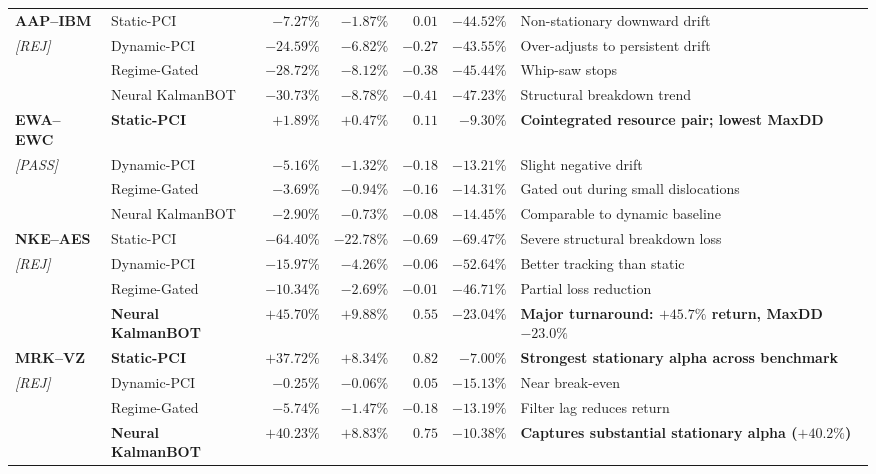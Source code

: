\documentclass[11pt, a4paper]{article}
\begin{document}
\begin{center}
\begin{longtable}{llrrrrp{4.8cm}}
\textbf{AAP--IBM} & Static-PCI & $-7.27\%$ & $-1.87\%$ & $0.01$ & $-44.52\%$ & Non-stationary downward drift \\
\small\textit{[REJ]} & Dynamic-PCI & $-24.59\%$ & $-6.82\%$ & $-0.27$ & $-43.55\%$ & Over-adjusts to persistent drift \\
 & Regime-Gated & $-28.72\%$ & $-8.12\%$ & $-0.38$ & $-45.44\%$ & Whip-saw stops \\
 & Neural KalmanBOT & $-30.73\%$ & $-8.78\%$ & $-0.41$ & $-47.23\%$ & Structural breakdown trend \\
\midrule
\textbf{EWA--EWC} & \textbf{Static-PCI} & $\mathbf{+1.89\%}$ & $\mathbf{+0.47\%}$ & $\mathbf{0.11}$ & $\mathbf{-9.30\%}$ & \textbf{Cointegrated resource pair; lowest MaxDD} \\
\small\textit{[PASS]} & Dynamic-PCI & $-5.16\%$ & $-1.32\%$ & $-0.18$ & $-13.21\%$ & Slight negative drift \\
 & Regime-Gated & $-3.69\%$ & $-0.94\%$ & $-0.16$ & $-14.31\%$ & Gated out during small dislocations \\
 & Neural KalmanBOT & $-2.90\%$ & $-0.73\%$ & $-0.08$ & $-14.45\%$ & Comparable to dynamic baseline \\
\midrule
\textbf{NKE--AES} & Static-PCI & $-64.40\%$ & $-22.78\%$ & $-0.69$ & $-69.47\%$ & Severe structural breakdown loss \\
\small\textit{[REJ]} & Dynamic-PCI & $-15.97\%$ & $-4.26\%$ & $-0.06$ & $-52.64\%$ & Better tracking than static \\
 & Regime-Gated & $-10.34\%$ & $-2.69\%$ & $-0.01$ & $-46.71\%$ & Partial loss reduction \\
 & \textbf{Neural KalmanBOT} & $\mathbf{+45.70\%}$ & $\mathbf{+9.88\%}$ & $\mathbf{0.55}$ & $\mathbf{-23.04\%}$ & \textbf{Major turnaround: $+45.7\%$ return, MaxDD $-23.0\%$} \\
\midrule
\textbf{MRK--VZ} & \textbf{Static-PCI} & $\mathbf{+37.72\%}$ & $\mathbf{+8.34\%}$ & $\mathbf{0.82}$ & $\mathbf{-7.00\%}$ & \textbf{Strongest stationary alpha across benchmark} \\
\small\textit{[REJ]} & Dynamic-PCI & $-0.25\%$ & $-0.06\%$ & $0.05$ & $-15.13\%$ & Near break-even \\
 & Regime-Gated & $-5.74\%$ & $-1.47\%$ & $-0.18$ & $-13.19\%$ & Filter lag reduces return \\
 & \textbf{Neural KalmanBOT} & $\mathbf{+40.23\%}$ & $\mathbf{+8.83\%}$ & $\mathbf{0.75}$ & $\mathbf{-10.38\%}$ & \textbf{Captures substantial stationary alpha ($+40.2\%$)} \\

\end{longtable}
\end{center}
\end{document}
